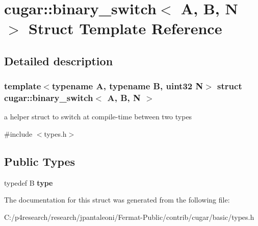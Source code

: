 \hypertarget{structcugar_1_1binary__switch}{}\section{cugar\+:\+:binary\+\_\+switch$<$ A, B, N $>$ Struct Template Reference}
\label{structcugar_1_1binary__switch}


\subsection{Detailed description}
\subsubsection*{template$<$typename A, typename B, uint32 N$>$\newline
struct cugar\+::binary\+\_\+switch$<$ A, B, N $>$}

a helper struct to switch at compile-\/time between two types 

{\ttfamily \#include $<$types.\+h$>$}

\subsection*{Public Types}
\begin{DoxyCompactItemize}
\item 
\mbox{\label{structcugar_1_1binary__switch_ad37a7ce04048bdba7670aa4763bbd09b}} 
typedef B {\bfseries type}
\end{DoxyCompactItemize}


The documentation for this struct was generated from the following file\+:\begin{DoxyCompactItemize}
\item 
C\+:/p4research/research/jpantaleoni/\+Fermat-\/\+Public/contrib/cugar/basic/types.\+h\end{DoxyCompactItemize}
